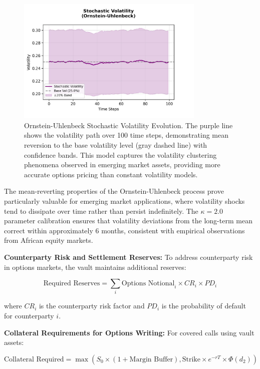 \documentclass[12pt]{article}
\begin{document}
\begin{figure}[h]
    \centering
    \includegraphics[width=0.8\textwidth]{stochastic_volatility_path.jpeg}
    \caption{Ornstein-Uhlenbeck Stochastic Volatility Evolution. The purple line shows the volatility path over 100 time steps, demonstrating mean reversion to the base volatility level (gray dashed line) with confidence bands. This model captures the volatility clustering phenomena observed in emerging market assets, providing more accurate options pricing than constant volatility models.}
    \label{fig:stochastic_volatility}
\end{figure}

The mean-reverting properties of the Ornstein-Uhlenbeck process prove particularly valuable for emerging market applications, where volatility shocks tend to dissipate over time rather than persist indefinitely. The $\kappa = 2.0$ parameter calibration ensures that volatility deviations from the long-term mean correct within approximately 6 months, consistent with empirical observations from African equity markets.


\textbf{Counterparty Risk and Settlement Reserves:}
To address counterparty risk in options markets, the vault maintains additional reserves:

\begin{equation}
\text{Required Reserves} = \sum_i \text{Options Notional}_i \times CR_i \times PD_i
\end{equation}

where $CR_i$ is the counterparty risk factor and $PD_i$ is the probability of default for counterparty $i$.

\textbf{Collateral Requirements for Options Writing:}
For covered calls using vault assets:

\begin{equation}
\text{Collateral Required} = \max(S_0 \times (1 + \text{Margin Buffer}), \text{Strike} \times e^{-rT} \times \Phi(d_2))
\end{equation}
\end{document}
